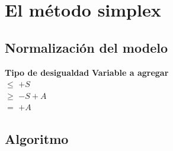 \chapter{El método simplex}
\section*{Normalización del modelo}

\begin{center}
	\begin{tabbing}
		\textbf{Tipo de desigualdad} \= \textbf{Variable a agregar} \\
		$\leq$ \> $+S$ \\
		$\geq$ \> $-S+A$ \\
		$=$ \> $+A$
	\end{tabbing}
\end{center}

\section{Algoritmo}

